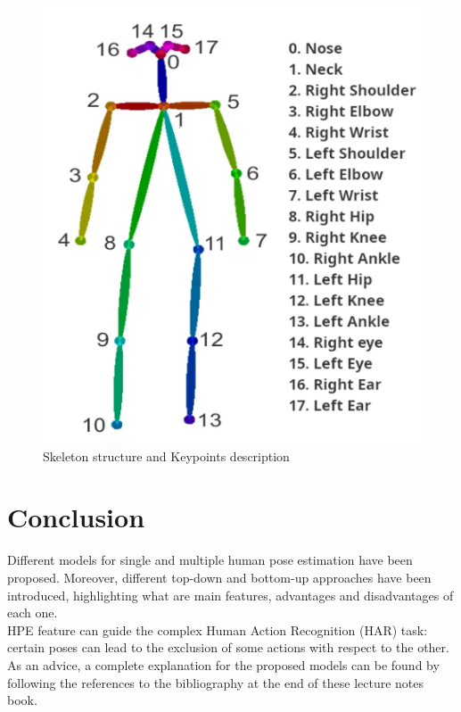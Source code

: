 \begin{figure}[h]
    \centering
    \includegraphics[scale=0.8]{img/Coco_Poses.png}    
    \caption{Skeleton structure and Keypoints description}
\end{figure}

\section{Conclusion}
Different models for single and multiple human pose estimation have been proposed. Moreover, different top-down and bottom-up approaches have been introduced, highlighting what are main features, advantages and disadvantages of each one.\\
HPE feature can guide the complex Human Action Recognition (HAR) task: certain poses can lead to the exclusion of some actions with respect to the other. As an advice, a complete explanation for the proposed models can be found by following the references to the bibliography at the end of these lecture notes book.



